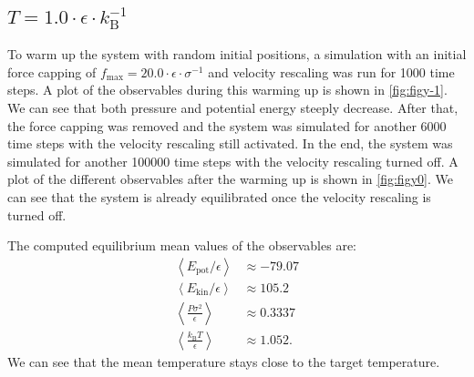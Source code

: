 \documentclass[a4paper,10pt,bibtotoc]{scrartcl}
\begin{document}
\newpage
\subsection{$T = 1.0\cdot \epsilon\cdot k_\mathrm{B}^{-1}$}
To warm up the system with random initial positions, a simulation with an initial force capping of $f_\mathrm{max} = 20.0\cdot\epsilon\cdot \sigma^{-1}$ and velocity rescaling was run for 1000 time steps.
A plot of the observables during this warming up is shown in \autoref{fig:figy-1}.
We can see that both pressure and potential energy steeply decrease.
After that, the force capping was removed and the system was simulated for another 6000 time steps with the velocity rescaling still activated. 
In the end, the system was simulated for another 100000 time steps with the velocity rescaling turned off.
A plot of the different observables after the warming up is shown in \autoref{fig:figy0}.
We can see that the system is already equilibrated once the velocity rescaling is turned off. 

The computed equilibrium mean values of the observables are:
\begin{align*}
\left\langle E_\mathrm{pot}/\epsilon \right\rangle &\approx-79.07\\
\left\langle E_\mathrm{kin}/\epsilon\right\rangle &\approx 105.2\\
\left\langle \frac{P\sigma ^2}{\epsilon}\right\rangle &\approx0.3337\\
\left\langle \frac{k_\mathrm{B}T}{\epsilon}\right\rangle &\approx1.052.
\end{align*}
We can see that the mean temperature stays close to the target temperature.
\end{document}
